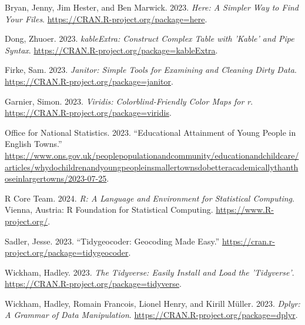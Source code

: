 \documentclass[
  letterpaper,
  DIV=11,
  numbers=noendperiod]{scrartcl}
\newlength{\cslhangindent}
\newenvironment{CSLReferences}[2] %
 {\begin{list}{}{%
  \setlength{\itemindent}{0pt}
  \setlength{\leftmargin}{0pt}
  \setlength{\parsep}{0pt}
  \ifodd #1
   \setlength{\leftmargin}{\cslhangindent}
   \setlength{\itemindent}{-1\cslhangindent}
  \fi
  \setlength{\itemsep}{#2\baselineskip}}}
 {\end{list}}
\begin{document}
\label{refs}
\begin{CSLReferences}{1}{0}
Bryan, Jenny, Jim Hester, and Ben Marwick. 2023. \emph{Here: A Simpler
Way to Find Your Files}. \url{https://CRAN.R-project.org/package=here}.

Dong, Zhuoer. 2023. \emph{kableExtra: Construct Complex Table with
'Kable' and Pipe Syntax}.
\url{https://CRAN.R-project.org/package=kableExtra}.

Firke, Sam. 2023. \emph{Janitor: Simple Tools for Examining and Cleaning
Dirty Data}. \url{https://CRAN.R-project.org/package=janitor}.

Garnier, Simon. 2023. \emph{Viridis: Colorblind-Friendly Color Maps for
r}. \url{https://CRAN.R-project.org/package=viridis}.

Office for National Statistics. 2023. {``Educational Attainment of Young
People in English Towns.''}
\url{https://www.ons.gov.uk/peoplepopulationandcommunity/educationandchildcare/articles/whydochildrenandyoungpeopleinsmallertownsdobetteracademicallythanthoseinlargertowns/2023-07-25}.

R Core Team. 2024. \emph{R: A Language and Environment for Statistical
Computing}. Vienna, Austria: R Foundation for Statistical Computing.
\url{https://www.R-project.org/}.

Sadler, Jesse. 2023. {``Tidygeocoder: Geocoding Made Easy.''}
\url{https://cran.r-project.org/package=tidygeocoder}.

Wickham, Hadley. 2023. \emph{The Tidyverse: Easily Install and Load the
'Tidyverse'}. \url{https://CRAN.R-project.org/package=tidyverse}.

Wickham, Hadley, Romain Francois, Lionel Henry, and Kirill Müller. 2023.
\emph{Dplyr: A Grammar of Data Manipulation}.
\url{https://CRAN.R-project.org/package=dplyr}.

\end{CSLReferences}
\end{document}
